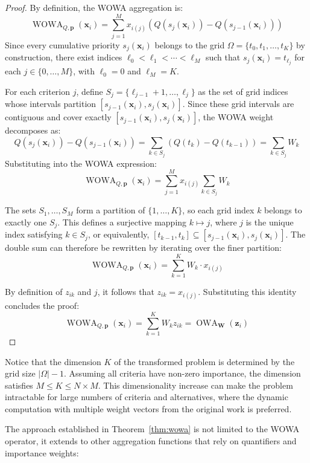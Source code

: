 \begin{proof}
		By definition, the WOWA aggregation is:
		\[ \operatorname{WOWA}_{Q,\mathbf{p}}(\mathbf{x}_i)=\sum_{j=1}^M x_{i(j)}\left(Q(s_j(\mathbf{x}_i))-Q(s_{j-1}(\mathbf{x}_i))\right) \]
		Since every cumulative priority $s_j(\mathbf{x}_i)$ belongs to the grid $\Omega = \{t_0, t_1, \ldots, t_K\}$ by construction, there exist indices $\ell_0 < \ell_1 < \cdots < \ell_M$ such that $s_j(\mathbf{x}_i) = t_{\ell_j}$ for each $j \in \{0, \ldots, M\}$, with $\ell_0 = 0$ and $\ell_M = K$.

		For each criterion $j$, define $S_j = \{\ell_{j-1}+1, \ldots, \ell_j\}$ as the set of grid indices whose intervals partition $[s_{j-1}(\mathbf{x}_i), s_j(\mathbf{x}_i)]$. Since these grid intervals are contiguous and cover exactly $[s_{j-1}(\mathbf{x}_i), s_j(\mathbf{x}_i)]$, the WOWA weight decomposes as:
		\[ Q(s_j(\mathbf{x}_i)) - Q(s_{j-1}(\mathbf{x}_i)) = \sum_{k \in S_j} \left( Q(t_k) - Q(t_{k-1}) \right) = \sum_{k \in S_j} W_k \]
		Substituting into the WOWA expression:
		\[ \operatorname{WOWA}_{Q,\mathbf{p}}(\mathbf{x}_i)=\sum_{j=1}^M x_{i(j)}\sum_{k \in S_j} W_k \]

		The sets $S_1, \ldots, S_M$ form a partition of $\{1, \ldots, K\}$, so each grid index $k$ belongs to exactly one $S_j$. This defines a surjective mapping $k \mapsto j$, where $j$ is the unique index satisfying $k \in S_{j}$, or equivalently, $[t_{k-1}, t_k] \subseteq [s_{j-1}(\mathbf{x}_i), s_{j}(\mathbf{x}_i)]$. The double sum can therefore be rewritten by iterating over the finer partition:
		\[ \operatorname{WOWA}_{Q,\mathbf{p}}(\mathbf{x}_i)=\sum_{k=1}^K W_k\cdot x_{i(j)} \]

		By definition of $z_{ik}$ and $j$, it follows that $z_{ik} = x_{i(j)}$.
		Substituting this identity concludes the proof:
		\[ \operatorname{WOWA}_{Q,\mathbf{p}}(\mathbf{x}_i)=\sum_{k=1}^K W_k z_{ik}=\operatorname{OWA}_{\mathbf{W}}(\mathbf{z}_i) \]
	\end{proof}

Notice that the dimension $K$ of the transformed problem is determined by the grid size $|\Omega|-1$. Assuming all criteria have non-zero importance, the dimension satisfies $M \le K \le N \times M$. This dimensionality increase can make the problem intractable for large numbers of criteria and alternatives, where the dynamic computation with multiple weight vectors from the original work is preferred.


The approach established in Theorem~\ref{thm:wowa} is not limited to the WOWA operator, it extends to other aggregation functions that rely on quantifiers and importance weights:

